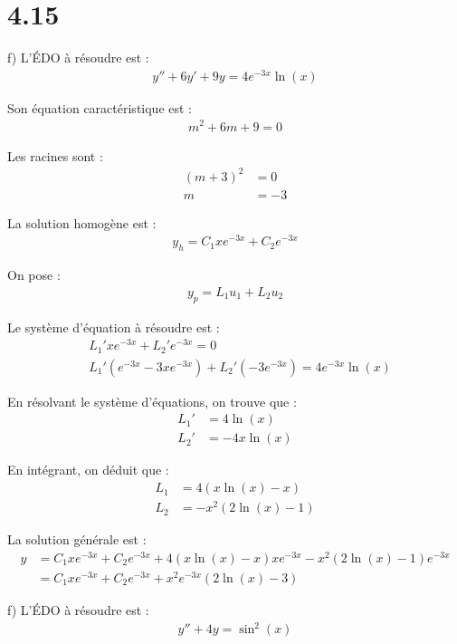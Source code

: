 \section*{4.15}

f) L'ÉDO à résoudre est :
\begin{align*}
    y'' +6y' +9y = 4e^{-3x}\ln(x)
\end{align*}

Son équation caractéristique est :
\begin{align*}
    m^2 +6m +9 = 0
\end{align*}

Les racines sont :
\begin{align*}
    (m+3)^2 &= 0 \\
    m &= -3
\end{align*}

La solution homogène est :
\begin{align*}
    y_h = C_1 xe^{-3x} +C_2 e^{-3x}
\end{align*}

On pose :
\begin{align*}
    y_p = L_1u_1 + L_2u_2
\end{align*}

Le système d'équation à résoudre est :
\begin{align*}
    &L_1' xe^{-3x} + L_2' e^{-3x} = 0 \\
    &L_1'(e^{-3x}-3xe^{-3x}) + L_2'(-3e^{-3x}) = 4e^{-3x}\ln(x)
\end{align*}

En résolvant le système d'équations, on trouve que :
\begin{align*}
    L_1' &= 4\ln(x) \\
    L_2' &= -4x\ln(x)
\end{align*}

En intégrant, on déduit que :
\begin{align*}
    L_1 &= 4(x\ln(x) -x) \\
    L_2 &= -x^2(2\ln(x)-1)
\end{align*}

La solution générale est :
\begin{align*}
    y &= C_1 x e^{-3x} + C_2 e^{-3x} + 4(x\ln(x)-x)x e^{-3x} - x^2(2\ln(x)-1) e^{-3x} \\
    &= C_1 x e^{-3x} + C_2 e^{-3x} +x^2 e^{-3x}(2\ln(x)-3)
\end{align*}

f) L'ÉDO à résoudre est :
\begin{align*}
    y'' +4y = \sin^2(x)
\end{align*}

